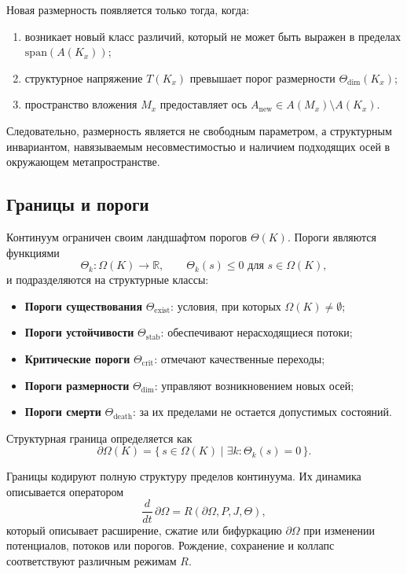 Новая размерность появляется только тогда, когда:

\begin{enumerate}
    \item возникает новый класс различий, который не может быть выражен в пределах \(\mathrm{span}(A(K_x))\);
    \item структурное напряжение \(T(K_x)\) превышает порог размерности \(\Theta_{\mathrm{dim}}(K_x)\);
    \item пространство вложения \(M_x\) предоставляет ось \(A_{\mathrm{new}}\in A(M_x)\setminus A(K_x)\).
\end{enumerate}

Следовательно, размерность является не свободным параметром, а структурным инвариантом, навязываемым несовместимостью и наличием подходящих осей в окружающем метапространстве.

\subsection{Границы и пороги}

Континуум ограничен своим ландшафтом порогов \(\Theta(K)\).
Пороги являются функциями
\[
\Theta_k : \Omega(K) \to \mathbb{R},
\qquad
\Theta_k(s)\le 0 \text{ для } s\in\Omega(K),
\]
и подразделяются на структурные классы:

\begin{itemize}
    \item \textbf{Пороги существования} \(\Theta_{\mathrm{exist}}\): условия, при которых \(\Omega(K)\neq\emptyset\);
    \item \textbf{Пороги устойчивости} \(\Theta_{\mathrm{stab}}\): обеспечивают нерасходящиеся потоки;
    \item \textbf{Критические пороги} \(\Theta_{\mathrm{crit}}\): отмечают качественные переходы;
    \item \textbf{Пороги размерности} \(\Theta_{\mathrm{dim}}\): управляют возникновением новых осей;
    \item \textbf{Пороги смерти} \(\Theta_{\mathrm{death}}\): за их пределами не остается допустимых состояний.
\end{itemize}

Структурная граница определяется как
\[
\partial\Omega(K) = \{\, s\in\Omega(K) \mid \exists k: \Theta_k(s)=0 \,\}.
\]

Границы кодируют полную структуру пределов континуума.
Их динамика описывается оператором
\[
\frac{d}{dt}\,\partial\Omega = R(\partial\Omega, P, J, \Theta),
\]
который описывает расширение, сжатие или бифуркацию \(\partial\Omega\) при изменении потенциалов, потоков или порогов.
Рождение, сохранение и коллапс соответствуют различным режимам \(R\).

